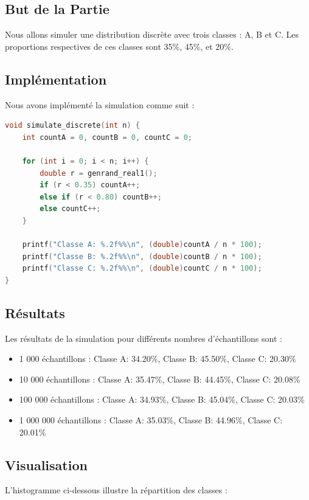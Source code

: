 \documentclass[a4paper,12pt]{report}
\begin{document}
\subsection*{But de la Partie}
Nous allons simuler une distribution discrète avec trois classes : A, B et C. Les proportions respectives de ces classes sont 35\%, 45\%, et 20\%.

\subsection*{Implémentation}
Nous avons implémenté la simulation comme suit :

\begin{lstlisting}[language=C]
void simulate_discrete(int n) {
    int countA = 0, countB = 0, countC = 0;

    for (int i = 0; i < n; i++) {
        double r = genrand_real1();
        if (r < 0.35) countA++;
        else if (r < 0.80) countB++;
        else countC++;
    }

    printf("Classe A: %.2f%%\n", (double)countA / n * 100);
    printf("Classe B: %.2f%%\n", (double)countB / n * 100);
    printf("Classe C: %.2f%%\n", (double)countC / n * 100);
}
\end{lstlisting}

\subsection*{Résultats}
Les résultats de la simulation pour différents nombres d'échantillons sont :

\begin{itemize}
    \item 1 000 échantillons : Classe A: 34.20\%, Classe B: 45.50\%, Classe C: 20.30\%
    \item 10 000 échantillons : Classe A: 35.47\%, Classe B: 44.45\%, Classe C: 20.08\%
    \item 100 000 échantillons : Classe A: 34.93\%, Classe B: 45.04\%, Classe C: 20.03\%
    \item 1 000 000 échantillons : Classe A: 35.03\%, Classe B: 44.96\%, Classe C: 20.01\%
\end{itemize}

\subsection*{Visualisation}
L'histogramme ci-dessous illustre la répartition des classes :
\end{document}
